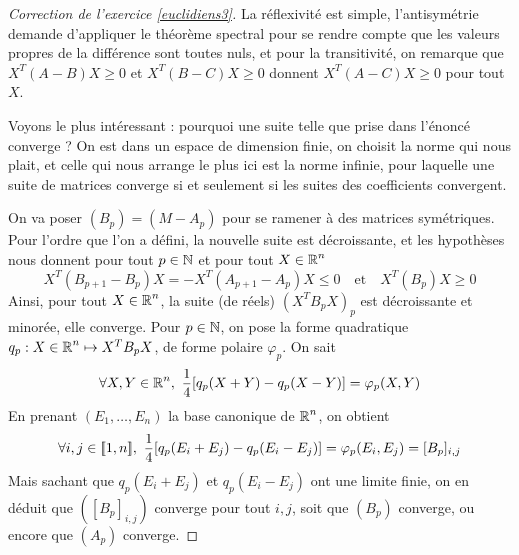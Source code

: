 \begin{proof}[Correction de l'exercice \ref{euclidiens3}]
	La réflexivité est simple, l'antisymétrie demande d'appliquer
	le théorème spectral pour se rendre compte que les valeurs propres de la différence sont toutes nuls,
	et pour la transitivité, on remarque que $X^T(A-B)X\geq 0$ et $X^T(B-C)X\geq 0$ donnent $X^T(A-C)X\geq 0$ pour tout $X$.

	Voyons le plus intéressant : pourquoi une suite telle que prise dans l'énoncé converge ? 
	On est dans un espace de dimension finie, 
	on choisit la norme qui nous plait, et celle qui nous arrange le plus ici est la norme infinie,
	pour laquelle une suite de matrices converge si et seulement si les suites des coefficients convergent. 

	On va poser $(B_p)=(M-A_p)$ pour se ramener à des matrices symétriques. 
	Pour l'ordre que l'on a défini, la nouvelle suite est décroissante, et les 
	hypothèses nous donnent pour tout $p\in\operatorname{\mathbb N}$ et pour tout $X\in\mathcal {\operatorname{\mathbb R}}^n$
	\[
		X^T(B_{p+1}-B_p)X=-X^T(A_{p+1}-A_p)X\leq 0\quad\text{et}\quad X^T(B_p)X\geq 0	
	\]
	Ainsi, pour tout $X\in\mathcal {\operatorname{\mathbb R}}^n$, la suite (de réels) $(X^TB_pX)_p$ est décroissante et minorée,
	elle converge. 
	Pour $p\in\operatorname{\mathbb N}$, on pose la forme quadratique $q_p:X\in\operatorname{\mathbb R}^n\mapsto X^TB_pX$, de forme polaire $\varphi_p$. 
	On sait 
	\[
		\forall X,Y\in\R^n,\ \frac14[q_p(X+Y)-q_p(X-Y)]=\varphi_p(X,Y)
	\]
	En prenant $(E_1,\dots,E_n)$ la base canonique de $\operatorname{\mathbb R}^n$, on obtient 
	\[
		\forall i,j\in\inl1n,\ \frac14[q_p(E_i+E_j)-q_p(E_i-E_j)]=\varphi_p(E_i,E_j)=[B_p]_{i,j}
	\]
	Mais sachant que $q_p(E_i+E_j)$ et $q_p(E_i-E_j)$ ont une limite finie, on en déduit que $([B_p]_{i,j})$ converge pour tout $i,j$,
	soit que $(B_p)$ converge, ou encore que $(A_p)$ converge.
\end{proof}

